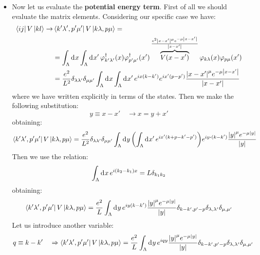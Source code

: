 \documentclass[11pt, a4paper, twoside, openright]{article}
\begin{document}
\begin{itemize}
\item Now let us evaluate the \textbf{potential energy term}. First of all we should evaluate the matrix elements. Considering our specific case we have:
\begin{equation*}
\begin{split}
  \bra{ij} V \ket{kl} \rightarrow & \bra{k'\lambda', p' \mu'} V \ket{k \lambda , p \mu }   = \\
  &=\int_{\Lambda }^{} \dd[]{x} \int_{\Lambda }^{} \dd[]{x'} \varphi _{k'\lambda' } ^\dag (x) \varphi ^\dag_{p' \mu'} (x') \overbrace{V(x-x')}^{ \frac{e^2 \abs{x-x'}^\mu  e^{ -\mu \abs{x-x'} } }{\abs{x-x'} } }  \varphi _{k\lambda } (x) \varphi _{p\mu } (x')    \\
  &= \frac{e^2}{L^2} \delta _{\lambda \lambda'} \delta _{\mu \mu'} \int_{\Lambda }^{} \dd[]{x} \int_{\Lambda }^{} \dd[]{x'} e^{i x (k-k')}     e^{i x' (p-p')}   \frac{\abs{x-x'}^\mu  e^{- \mu \abs{x-x'}}  }{\abs{x-x'} }
\end{split}
\end{equation*}
where we have written explicitly in terms of the states.
Then we make the following substitution:
\begin{equation*}
  y \equiv x - x' \quad \rightarrow x = y + x'
\end{equation*}
obtaining:
\begin{equation*}
  \bra{k'\lambda', p' \mu'} V \ket{k \lambda , p \mu }   =  \frac{e^2}{L^2} \delta _{\lambda \lambda'} \delta _{\mu \mu'} \int_{\Lambda  }^{} \dd[]{y} \qty(\int_{\Lambda }^{} \dd[]{x'} e^{i x' (k+p-k'-p')}   )
  e^{i y \vdot (k-k') } \frac{\abs{y}^\mu  e^{- \mu \abs{y} } }{\abs{y} }
\end{equation*}
Then we use the relation:
\begin{equation}
  \int_{\Lambda }^{} \dd[]{x} e^{i \qty(k_2 - k_1) x } = L \delta _{k_1 k_2}
\end{equation}
obtaining:
\begin{equation*}
    \bra{k'\lambda', p' \mu '} V \ket{k \lambda , p \mu } =
     \frac{e^2}{L} \int_{\Lambda  }^{} \dd[]{y} e^{i y (k-k')} \frac{\abs{y} ^\mu e^{- \mu \abs{y} } }{\abs{y} } \delta _{k-k',p'-p}  \delta _{\lambda , \lambda'} \delta _{\mu , \mu'}
\end{equation*}
Let us introduce another variable:
\begin{equation}
   q \equiv k - k'\quad \Rightarrow   \bra{k'\lambda', p' \mu'} V \ket{k \lambda , p \mu } =  \frac{e^2}{L} \int_{\Lambda  }^{} \dd[]{y} e^{i q y } \frac{\abs{y} ^\mu e^{- \mu \abs{y} } }{\abs{y} } \delta _{k-k',p'-p}  \delta _{\lambda , \lambda'} \delta _{\mu , \mu'}

\end{equation}
\end{itemize}
\end{document}
